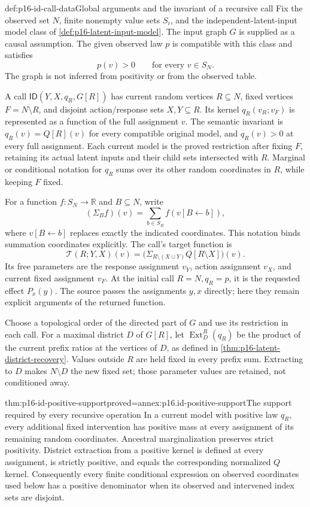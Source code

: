 \begin{hbdefinition}{def:p16-id-call-data}{Global arguments and the invariant of a recursive call}
Fix the observed set \(N\), finite nonempty value sets \(S_i\),
and the independent-latent-input model class of
\cref{def:p16-latent-input-model}. The input graph \(G\) is
supplied as a causal assumption. The given observed law \(p\) is
compatible with this class and satisfies
\[
 p(v)>0\qquad\text{for every }v\in S_N.
\]
The graph is not inferred from positivity or from the observed table.

A call \(\mathsf{ID}(Y,X,q_R,G[R])\) has current random
vertices \(R\subseteq N\), fixed vertices \(F=N\setminus R\),
and disjoint action/response sets \(X,Y\subseteq R\).
Its kernel \(q_R(v_R;v_F)\) is represented as a function of
the full assignment \(v\). The semantic invariant is
\(q_R(v)=Q[R](v)\) for every compatible original model, and
\(q_R(v)>0\) at every full assignment. Each current model is
the proved restriction after fixing \(F\), retaining its actual
latent inputs and their child sets intersected with \(R\).
Marginal or conditional notation for \(q_R\) sums over its other
random coordinates in \(R\), while keeping \(F\) fixed.

For a function \(f:S_N\to\mathbb R\) and \(B\subseteq N\),
write
\[
 (\Sigma_B f)(v)=\sum_{b\in S_B}f(v[B\leftarrow b]),
\]
where \(v[B\leftarrow b]\) replaces exactly the indicated
coordinates. This notation binds summation coordinates explicitly.
The call's target function is
\[
 \mathcal T(R;Y,X)(v)=
      \bigl(\Sigma_{R\setminus(X\cup Y)}Q[R\setminus X]\bigr)(v).
\]
Its free parameters are the response assignment \(v_Y\), action
assignment \(v_X\), and current fixed assignment \(v_F\).
At the initial call \(R=N,q_R=p\), it is the requested effect
\(P_x(y)\). The source passes the assignments \(y,x\) directly;
here they remain explicit arguments of the returned function.

Choose a topological order of the directed part of \(G\) and use
its restriction in each call. For a maximal district \(D\) of
\(G[R]\), let \(\operatorname{Ext}^R_D(q_R)\) be the product
of the current prefix ratios at the vertices of \(D\), as defined
in \cref{thm:p16-latent-district-recovery}. Values outside \(R\)
are held fixed in every prefix sum. Extracting to \(D\) makes
\(N\setminus D\) the new fixed set; those parameter values are
retained, not conditioned away.
\end{hbdefinition}

\begin{hblemma}{thm:p16-id-positive-support}{proved=annex:p16.id-positive-support}{The support required by every recursive operation}
In a current model with positive law \(q_R\), every additional
fixed intervention has positive mass at every assignment of its
remaining random coordinates. Ancestral marginalization preserves
strict positivity. District extraction from a positive kernel is
defined at every assignment, is strictly positive, and equals the
corresponding normalized \(Q\) kernel. Consequently every finite
conditional expression on observed coordinates used below has a positive denominator when
its observed and intervened index sets are disjoint.
\end{hblemma}

